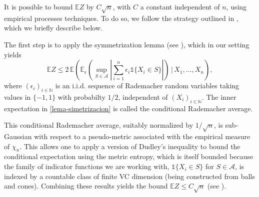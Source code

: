\documentclass[11pt]{amsart}
\theoremstyle{definition}
\theoremstyle{remark}
\numberwithin{equation}{section}
\newcommand{\N}{{\mathbb N}}
\newcommand{\E}{\mathbb{E}}
\begin{document}
It is possible to bound $\E Z$ by $C\sqrt{n}$, with $C$ a constant independent of $n$, using empirical processes techniques. 
To do so, we follow the strategy outlined in \cite[Section~13.3]{BLM-concentration}, which we briefly describe below. 

The first step is to apply the symmetrization lemma (see \cite[Lem.~11.14]{BLM-concentration}), which in our setting yields
\begin{equation}
\label{lema-simetrizacion}
\E Z \le 2\, \E\!\left( \E_{\epsilon}\left( \sup_{S\in\mathcal{A}}
\left|\sum_{i=1}^n \epsilon_i \mathds{1}\{X_i\in S\}\right|\right) 
\,\Big|\, X_1,\dots,X_n \right),
\end{equation}
where $(\epsilon_i)_{i\in\N}$ is an i.i.d. sequence of Rademacher random variables taking values in $\{-1,1\}$ with probabilty $1/2$, independent of $(X_i)_{i\in\N}$. 
The inner expectation in \eqref{lema-simetrizacion} is called the conditional Rademacher average.

This conditional Rademacher average, suitably normalized by $1/\sqrt{n}$, is sub-Gaussian with respect to a pseudo-metric associated with the empirical measure of $\chi_n$. 
This allows one to apply a version of Dudley's inequality \cite[Lem.~13.5]{BLM-concentration} to bound the conditional expectation using the metric entropy, which is itself bounded because the family of indicator functions we are working with, $\mathds{1}\{X_i\in S\}$ for $S\in\mathcal{A}$, is indexed by a countable class of finite VC dimension (being constructed from balls and cones).
Combining these results yields the bound $\E Z \le C\sqrt{n}$ (see \cite[Thm.~13.5]{BLM-concentration}).
\end{document}
